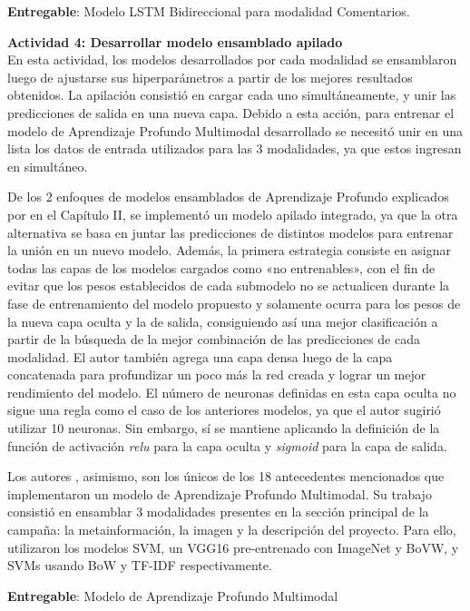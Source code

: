 \textbf{Entregable}: Modelo LSTM Bidireccional para modalidad Comentarios.

\vspace{0.3cm}
\textbf{Actividad 4: Desarrollar modelo ensamblado apilado}
\\
En esta actividad, los modelos desarrollados por cada modalidad se ensamblaron luego de ajustarse sus hiperparámetros a partir de los mejores resultados obtenidos. La apilación consistió en cargar cada uno simultáneamente, y unir las predicciones de salida en una nueva capa. Debido a esta acción, para entrenar el modelo de Aprendizaje Profundo Multimodal desarrollado se necesitó unir en una lista los datos de entrada utilizados para las 3 modalidades, ya que estos ingresan en simultáneo.

De los 2 enfoques de modelos ensamblados de Aprendizaje Profundo explicados por \cite{tec_brownlee2018stacked_models} en el Capítulo II, se implementó un modelo apilado integrado, ya que la otra alternativa se basa en juntar las predicciones de distintos modelos para entrenar la unión en un nuevo modelo. Además, la primera estrategia consiste en asignar todas las capas de los modelos cargados como «no entrenables», con el fin de evitar que los pesos establecidos de cada submodelo no se actualicen durante la fase de entrenamiento del modelo propuesto y solamente ocurra para los pesos de la nueva capa oculta y la de salida, consiguiendo así una mejor clasificación a partir de la búsqueda de la mejor combinación de las predicciones de cada modalidad. El autor también agrega una capa densa luego de la capa concatenada para profundizar un poco más la red creada y lograr un mejor rendimiento del modelo. El número de neuronas definidas en esta capa oculta no sigue una regla como el caso de los anteriores modelos, ya que el autor sugirió utilizar 10 neuronas. Sin embargo, sí se mantiene aplicando la definición de la función de activación \textit{relu} para la capa oculta y \textit{sigmoid} para la capa de salida.

Los autores \cite{pr_cheng2019deeplearning}, asimismo, son los únicos de los 18 antecedentes mencionados que implementaron un modelo de Aprendizaje Profundo Multimodal. Su trabajo consistió en ensamblar 3 modalidades presentes en la sección principal de la campaña: la metainformación, la imagen y la descripción del proyecto. Para ello, utilizaron los modelos SVM, un VGG16 pre-entrenado con ImageNet y BoVW, y SVMs usando BoW y TF-IDF respectivamente.

\textbf{Entregable}: Modelo de Aprendizaje Profundo Multimodal

